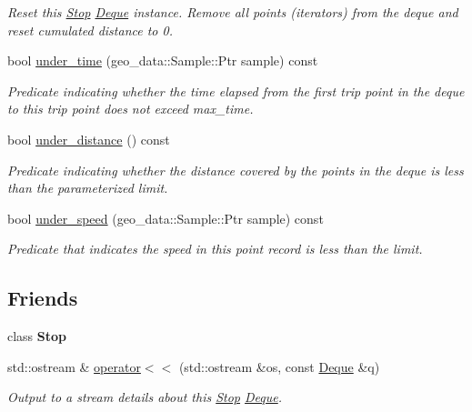 \begin{DoxyCompactItemize}
\begin{DoxyCompactList}\small\item\em Reset this \hyperlink{classcvdi_1_1Stop}{Stop} \hyperlink{classcvdi_1_1Stop_1_1Deque}{Deque} instance. Remove all points (iterators) from the deque and reset cumulated distance to 0. \end{DoxyCompactList}\item 
bool \hyperlink{classcvdi_1_1Stop_1_1Deque_a4e267019ceae75025ac0aadc4c073a28}{under\+\_\+time} (geo\+\_\+data\+::\+Sample\+::\+Ptr sample) const 
\begin{DoxyCompactList}\small\item\em Predicate indicating whether the time elapsed from the first trip point in the deque to this trip point does not exceed max\+\_\+time. \end{DoxyCompactList}\item 
bool \hyperlink{classcvdi_1_1Stop_1_1Deque_a891bee58957586879e58a34ef4839c3e}{under\+\_\+distance} () const 
\begin{DoxyCompactList}\small\item\em Predicate indicating whether the distance covered by the points in the deque is less than the parameterized limit. \end{DoxyCompactList}\item 
bool \hyperlink{classcvdi_1_1Stop_1_1Deque_a26a9eef47ae371704ec54b4442c0649b}{under\+\_\+speed} (geo\+\_\+data\+::\+Sample\+::\+Ptr sample) const 
\begin{DoxyCompactList}\small\item\em Predicate that indicates the speed in this point record is less than the limit. \end{DoxyCompactList}\end{DoxyCompactItemize}
\subsection*{Friends}
\begin{DoxyCompactItemize}
\item 
class {\bfseries Stop}\hypertarget{classcvdi_1_1Stop_1_1Deque_a06c1356535b989762bfdfc0f8fcc76ae}{}\label{classcvdi_1_1Stop_1_1Deque_a06c1356535b989762bfdfc0f8fcc76ae}

\item 
std\+::ostream \& \hyperlink{classcvdi_1_1Stop_1_1Deque_a573b40bf9fa3ab3485f1a8335d1dac7c}{operator$<$$<$} (std\+::ostream \&os, const \hyperlink{classcvdi_1_1Stop_1_1Deque}{Deque} \&q)
\begin{DoxyCompactList}\small\item\em Output to a stream details about this \hyperlink{classcvdi_1_1Stop}{Stop} \hyperlink{classcvdi_1_1Stop_1_1Deque}{Deque}. \end{DoxyCompactList}\end{DoxyCompactItemize}


